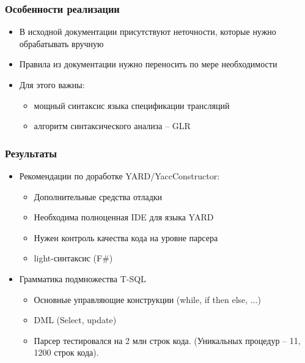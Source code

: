 \documentclass{beamer}
\begin{document}
\begin{frame}
	\transwipe[direction=90]
	\frametitle{Особенности реализации}
    \begin{itemize}
        \item В исходной документации присутствуют неточности, которые нужно обрабатывать вручную
        \item Правила из документации нужно переносить по мере необходимости
        \item Для этого важны:
            \begin{itemize}
                \item мощный синтаксис языка спецификации трансляций
                \item алгоритм синтаксического анализа -- GLR
            \end{itemize}
    \end{itemize}
\end{frame}    

\begin{frame}
	\transwipe[direction=90]
	\frametitle{Результаты}
    \begin{itemize}
        \item Рекомендации по доработке YARD/YaccConstructor:
            \begin{itemize}
                \item Дополнительные средства отладки
                \item Необходима полноценная IDE для языка YARD
                \item Нужен контроль качества кода на уровне парсера
                \item light-синтаксис (F\#)
            \end{itemize}
        \item Грамматика подмножества T-SQL
            \begin{itemize}
                \item Основные управляющие конструкции (while, if then else, ...)
                \item DML (Select, update)
                \item Парсер тестировался на 2 млн строк кода. (Уникальных процедур -- 11, 1200 строк кода).
            \end{itemize}
    \end{itemize}
\end{frame}    

\author[Орлов Илья]{}
\end{document}
